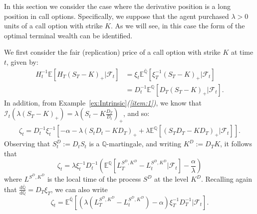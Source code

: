 \documentclass[a4paper]{amsart}
\theoremstyle{definition}
\theoremstyle{remark}
\numberwithin{equation}{section}
\newcommand{\E}{\mathbb{E}}
\newcommand{\Q}{\mathbb{Q}}
\newcommand{\di}{\mathrm{d}}
\newcommand{\Fc}{\mathcal{F}}
\newcommand{\Ep}[1]{\E\left[#1\right]}
\newcommand{\Eq}[1]{\E^{\Q}\left[#1\right]}
\newcommand{\Ebq}[1]{\E^{\bQ}\left[#1\right]}
\newcommand{\comment}[1]{{\color{red} \bf #1}}
\newcommand{\ol}{\overline}
\newcommand{\In}{\mathcal{I}} %
\newcommand{\bQ}{\ol{\mathbb{Q}}}
\begin{document}
In this section we consider the case where the derivative position is a long position in call options. Specifically, we suppose that the agent purchased $\lambda > 0$ units of a call option with strike $K$. As we will see, in this case the form of the optimal terminal wealth can be identified.

We first consider the fair (replication) price of a call option with strike $K$ at time $t$, given by:
\begin{align*}
 H_t^{-1} \Ep{H_T (S_T-K)_+|\Fc_t} 
  & = \xi_t \Ebq{\xi_T^{-1} (S_T-K)_+|\Fc_t} \\ 
  & = D_t^{-1} \Eq{D_T (S_T-K)_+|\Fc_t}.
\end{align*} 
In addition, from Example~\ref{ex:Intrinsic}{\it(\ref{item:1})}, we know that $\In_t(\lambda(S_T-K)_+) = \lambda \left(S_t - K \frac{D_T}{D_t}\right)_+$, and so:
\begin{align*}
  \zeta_t = D_t^{-1} \xi_t^{-1}   \left[ - \alpha-\lambda (S_t D_t - K D_T)_+ +\lambda \Eq{(S_T D_T -KD_T )_+| \Fc_t}    \right].
\end{align*}
Observing that $S_t^D:= D_t S_t$ is a $\Q$-martingale, and writing $K^D :=  D_T K$, it follows that
\begin{equation}
  \label{eq:8}
  \zeta_t =\lambda  \xi_t^{-1} D_t^{-1} \left(\Eq{L_{T}^{S^D,K^D}-L_t^{S^D,K^D}|\Fc_t}-\frac{\alpha}{\lambda}\right)
\end{equation}
where $L^{S^D,K^D}$ is the local time of the process $S^D$ at the level $K^D$. Recalling again that $\frac{\di \bQ}{\di \Q} = D_T \xi_T$, we can also write
\begin{equation*}
    \zeta_t = \Ebq{\left(\lambda \left(L_{T}^{S^D,K^D}-L_t^{S^D,K^D}\right)-\alpha\right) \xi_T^{-1} D_T^{-1} |\Fc_t}.
\end{equation*}
\end{document}
